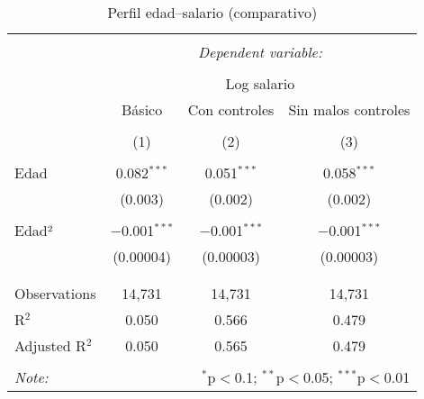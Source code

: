 
\begin{table}[!htbp] \centering 
  \caption{Perfil edad–salario (comparativo)} 
  \label{} 
\begin{tabular}{@{\extracolsep{5pt}}lccc} 
\\[-1.8ex]\hline 
\hline \\[-1.8ex] 
 & \multicolumn{3}{c}{\textit{Dependent variable:}} \\ 
\cline{2-4} 
\\[-1.8ex] & \multicolumn{3}{c}{Log salario} \\ 
 & Básico & Con controles & Sin malos controles \\ 
\\[-1.8ex] & (1) & (2) & (3)\\ 
\hline \\[-1.8ex] 
 Edad & 0.082$^{***}$ & 0.051$^{***}$ & 0.058$^{***}$ \\ 
  & (0.003) & (0.002) & (0.002) \\ 
  & & & \\ 
 Edad² & $-$0.001$^{***}$ & $-$0.001$^{***}$ & $-$0.001$^{***}$ \\ 
  & (0.00004) & (0.00003) & (0.00003) \\ 
  & & & \\ 
\hline \\[-1.8ex] 
Observations & 14,731 & 14,731 & 14,731 \\ 
R$^{2}$ & 0.050 & 0.566 & 0.479 \\ 
Adjusted R$^{2}$ & 0.050 & 0.565 & 0.479 \\ 
\hline 
\hline \\[-1.8ex] 
\textit{Note:}  & \multicolumn{3}{r}{$^{*}$p$<$0.1; $^{**}$p$<$0.05; $^{***}$p$<$0.01} \\ 
\end{tabular} 
\end{table} 
